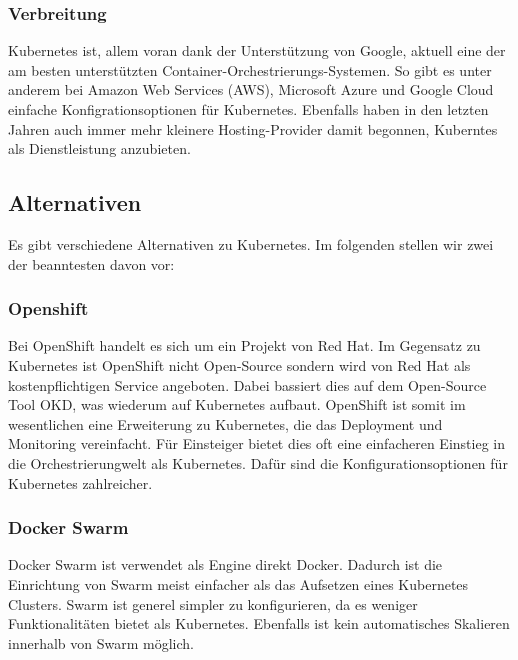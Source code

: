 \subsubsection{Verbreitung}
Kubernetes ist, allem voran dank der Unterstützung von Google, aktuell eine der am besten unterstützten Container-Orchestrierungs-Systemen. So gibt es unter anderem bei Amazon Web Services (AWS), Microsoft Azure und Google Cloud einfache Konfigrationsoptionen für Kubernetes.
Ebenfalls haben in den letzten Jahren auch immer mehr kleinere Hosting-Provider damit begonnen, Kuberntes als Dienstleistung anzubieten.

\subsection{Alternativen}
Es gibt verschiedene Alternativen zu Kubernetes. Im folgenden stellen wir zwei der beanntesten davon vor:

\subsubsection{Openshift}
Bei OpenShift handelt es sich um ein Projekt von Red Hat. Im Gegensatz zu Kubernetes ist OpenShift nicht Open-Source sondern wird von Red Hat als kostenpflichtigen Service angeboten. Dabei bassiert dies auf dem Open-Source Tool OKD, was wiederum auf Kubernetes aufbaut.
OpenShift ist somit im wesentlichen eine Erweiterung zu Kubernetes, die das Deployment und Monitoring vereinfacht. Für Einsteiger bietet dies oft eine einfacheren Einstieg in die Orchestrierungwelt als Kubernetes. Dafür sind die Konfigurationsoptionen für Kubernetes zahlreicher. \cite{cloudowski:openshift}

\subsubsection{Docker Swarm}
Docker Swarm ist verwendet als Engine direkt Docker. Dadurch ist die Einrichtung von Swarm meist einfacher als das Aufsetzen eines Kubernetes Clusters. Swarm ist generel simpler zu konfigurieren, da es weniger Funktionalitäten bietet als Kubernetes. Ebenfalls ist kein automatisches Skalieren innerhalb von Swarm möglich. \cite{docker:swarm}
\clearpage